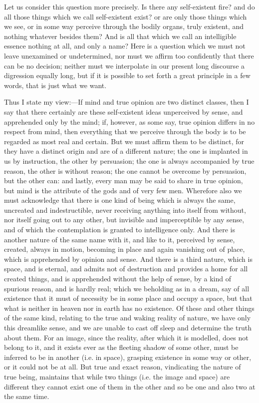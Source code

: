 Let us consider this question more precisely. Is there any self-existent
fire? and do all those things which we call self-existent exist? or are
only those things which we see, or in some way perceive through the bodily
organs, truly existent, and nothing whatever besides them? And is all that
which we call an intelligible essence nothing at all, and only a name?
Here is a question which we must not leave unexamined or undetermined, nor
must we affirm too confidently that there can be no decision; neither must
we interpolate in our present long discourse a digression equally long,
but if it is possible to set forth a great principle in a few words, that
is just what we want.

Thus I state my view:—If mind and true opinion are two distinct
classes, then I say that there certainly are these self-existent ideas
unperceived by sense, and apprehended only by the mind; if, however, as
some say, true opinion differs in no respect from mind, then everything
that we perceive through the body is to be regarded as most real and
certain. But we must affirm them to be distinct, for they have a distinct
origin and are of a different nature; the one is implanted in us by
instruction, the other by persuasion; the one is always accompanied by
true reason, the other is without reason; the one cannot be overcome by
persuasion, but the other can: and lastly, every man may be said to share
in true opinion, but mind is the attribute of the gods and of very few
men. Wherefore also we must acknowledge that there is one kind of being
which is always the same, uncreated and indestructible, never receiving
anything into itself from without, nor itself going out to any other, but
invisible and imperceptible by any sense, and of which the contemplation
is granted to intelligence only. And there is another nature of the same
name with it, and like to it, perceived by sense, created, always in
motion, becoming in place and again vanishing out of place, which is
apprehended by opinion and sense. And there is a third nature, which is
space, and is eternal, and admits not of destruction and provides a home
for all created things, and is apprehended without the help of sense, by a
kind of spurious reason, and is hardly real; which we beholding as in a
dream, say of all existence that it must of necessity be in some place and
occupy a space, but that what is neither in heaven nor in earth has no
existence. Of these and other things of the same kind, relating to the
true and waking reality of nature, we have only this dreamlike sense, and
we are unable to cast off sleep and determine the truth about them. For an
image, since the reality, after which it is modelled, does not belong to
it, and it exists ever as the fleeting shadow of some other, must be
inferred to be in another (i.e. in space), grasping existence in some way
or other, or it could not be at all. But true and exact reason,
vindicating the nature of true being, maintains that while two things
(i.e. the image and space) are different they cannot exist one of them in
the other and so be one and also two at the same time.

